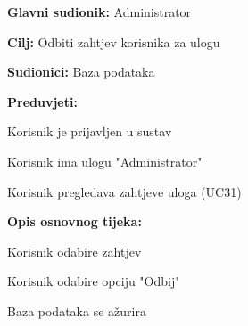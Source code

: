 					\noindent {}
					\begin{packed_item}
	
						\item \textbf{Glavni sudionik: } Administrator
						\item  \textbf{Cilj:} Odbiti zahtjev korisnika za ulogu
						\item  \textbf{Sudionici:} Baza podataka
						\item  \textbf{Preduvjeti:}
						\item[] \begin{packed_enum}
							\item Korisnik je prijavljen u sustav
							\item Korisnik ima ulogu "Administrator"
							\item Korisnik pregledava zahtjeve uloga (UC31)
						\end{packed_enum}
						\item  \textbf{Opis osnovnog tijeka:}
						
						\item[] \begin{packed_enum}
	
							\item Korisnik odabire zahtjev
							\item Korisnik odabire opciju "Odbij"
							\item Baza podataka se ažurira
						\end{packed_enum}
					
					\end{packed_item}
					
